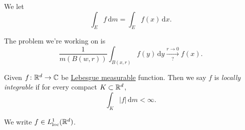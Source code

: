 \begin{notation}
	We let
	\[
		\int _E f \,\mathrm{d} m = \int _E f(x) \,\mathrm{d} x.
	\]
\end{notation}

The problem we're working on is
\[
	\frac{1}{m(B(w, r))}\int _{B(x, r)}f(y)\,\mathrm{d} y \overset{r\to 0}{\underset{?}{\longrightarrow}}f(x).
\]
\begin{definition}\label{def:locally-integrable}
	Given \(f\colon \mathbb{\MakeUppercase{r}} ^d \to \mathbb{\MakeUppercase{c}} \) be \hyperref[def:Lebesgue-measurable-function]{Lebesgue measurable}
	function. Then we say \(f\) is \emph{locally integrable} if for every compact \(K\subset \mathbb{\MakeUppercase{r}} ^d\),
	\[
		\int _K \left\vert f \right\vert \,\mathrm{d} m < \infty.
	\]

	We write \(f\in L^1_{\text{loc} }(\mathbb{\MakeUppercase{r}} ^d)\).
\end{definition}

